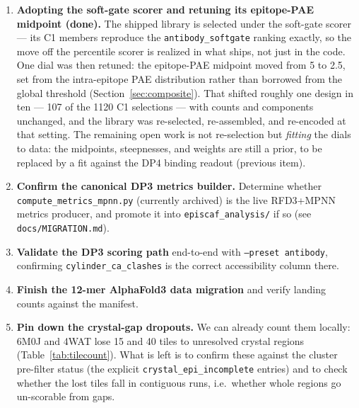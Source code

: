 \begin{enumerate}
\item \textbf{Adopting the soft-gate scorer and retuning its epitope-PAE midpoint (done).} The shipped
library is selected under the soft-gate scorer --- its C1 members reproduce the
\texttt{antibody\_softgate} ranking exactly, so the move off the percentile scorer is realized in what
ships, not just in the code. One dial was then retuned: the epitope-PAE midpoint moved from 5 to
\num{2.5}, set from the intra-epitope PAE distribution rather than borrowed from the global threshold
(Section~\ref{sec:composite}). That shifted roughly one design in ten --- \num{107} of the \num{1120} C1
selections --- with counts and components unchanged, and the library was re-selected, re-assembled, and
re-encoded at that setting. The remaining open work is not re-selection but \emph{fitting} the dials to
data: the midpoints, steepnesses, and weights are still a prior, to be replaced by a fit against the DP4
binding readout (previous item).

\item \textbf{Confirm the canonical DP3 metrics builder.} Determine whether
\texttt{compute\_metrics\_mpnn.py} (currently archived) is the live RFD3+MPNN metrics
producer, and promote it into \texttt{episcaf\_analysis/} if so (see \texttt{docs/MIGRATION.md}).

\item \textbf{Validate the DP3 scoring path} end-to-end with \texttt{--preset antibody},
confirming \texttt{cylinder\_ca\_clashes} is the correct accessibility column there.

\item \textbf{Finish the 12-mer AlphaFold3 data migration} and verify landing counts
against the manifest.

\item \textbf{Pin down the crystal-gap dropouts.} We can already count them locally: 6M0J and
4WAT lose 15 and 40 tiles to unresolved crystal regions (Table~\ref{tab:tilecount}). What is
left is to confirm these against the cluster pre-filter status (the explicit
\texttt{crystal\_epi\_incomplete} entries) and to check whether the lost tiles fall in
contiguous runs, i.e.\ whether whole regions go un-scorable from gaps.
\end{enumerate}
